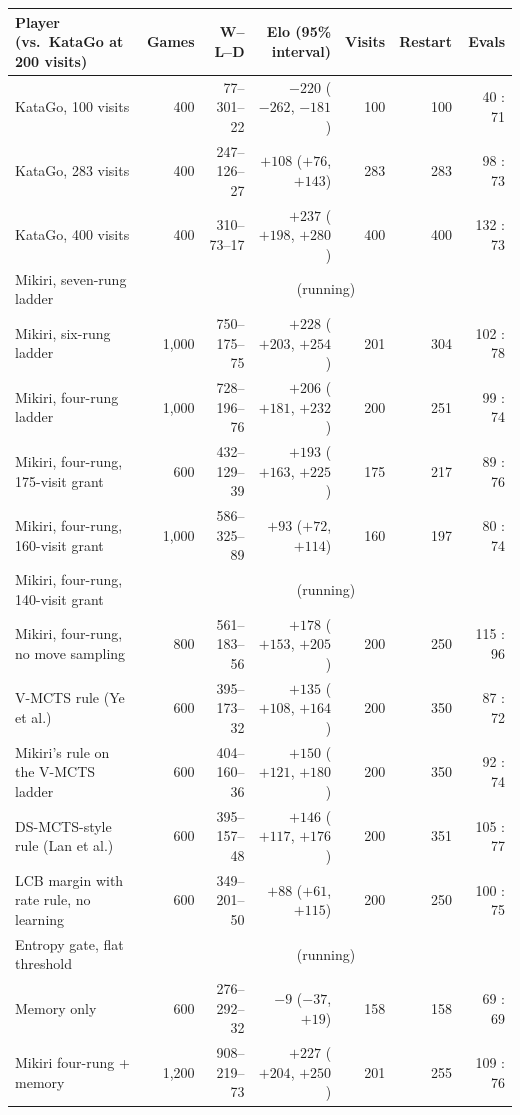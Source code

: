 \begin{tabular}{lrrrrrr}
\toprule
Player (vs.\ KataGo at 200 visits) & Games & W--L--D & Elo (95\% interval) & Visits & Restart & Evals \\
\midrule
KataGo, 100 visits & 400 & 77--301--22 & $-220$ ($-262$, $-181$) & 100 & 100 & 40 : 71 \\
KataGo, 283 visits & 400 & 247--126--27 & $+108$ ($+76$, $+143$) & 283 & 283 & 98 : 73 \\
KataGo, 400 visits & 400 & 310--73--17 & $+237$ ($+198$, $+280$) & 400 & 400 & 132 : 73 \\
\midrule
Mikiri, seven-rung ladder & \multicolumn{6}{c}{(running)} \\
Mikiri, six-rung ladder & 1,000 & 750--175--75 & $+228$ ($+203$, $+254$) & 201 & 304 & 102 : 78 \\
Mikiri, four-rung ladder & 1,000 & 728--196--76 & $+206$ ($+181$, $+232$) & 200 & 251 & 99 : 74 \\
Mikiri, four-rung, 175-visit grant & 600 & 432--129--39 & $+193$ ($+163$, $+225$) & 175 & 217 & 89 : 76 \\
Mikiri, four-rung, 160-visit grant & 1,000 & 586--325--89 & $+93$ ($+72$, $+114$) & 160 & 197 & 80 : 74 \\
Mikiri, four-rung, 140-visit grant & \multicolumn{6}{c}{(running)} \\
Mikiri, four-rung, no move sampling & 800 & 561--183--56 & $+178$ ($+153$, $+205$) & 200 & 250 & 115 : 96 \\
\midrule
V-MCTS rule (Ye et al.) & 600 & 395--173--32 & $+135$ ($+108$, $+164$) & 200 & 350 & 87 : 72 \\
Mikiri's rule on the V-MCTS ladder & 600 & 404--160--36 & $+150$ ($+121$, $+180$) & 200 & 350 & 92 : 74 \\
DS-MCTS-style rule (Lan et al.) & 600 & 395--157--48 & $+146$ ($+117$, $+176$) & 200 & 351 & 105 : 77 \\
LCB margin with rate rule, no learning & 600 & 349--201--50 & $+88$ ($+61$, $+115$) & 200 & 250 & 100 : 75 \\
Entropy gate, flat threshold & \multicolumn{6}{c}{(running)} \\
\midrule
Memory only & 600 & 276--292--32 & $-9$ ($-37$, $+19$) & 158 & 158 & 69 : 69 \\
Mikiri four-rung + memory & 1,200 & 908--219--73 & $+227$ ($+204$, $+250$) & 201 & 255 & 109 : 76 \\
\bottomrule
\end{tabular}
